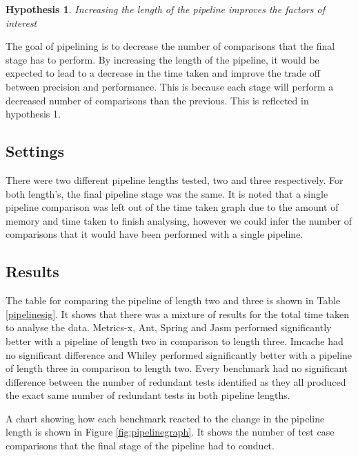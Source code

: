 \documentclass[11pt
              , a4paper
              , twoside
              , openright
              ]{report}
\newtheorem{hyp}{Hypothesis}
\begin{document}
\begin{hyp}
Increasing the length of the pipeline improves the factors of interest
\end{hyp}

The goal of pipelining is to decrease the number of comparisons that the final stage has to perform. By increasing the length of the pipeline, it would be expected to lead to a decrease in the time taken and improve the trade off between precision and performance. This is because each stage will perform a decreased number of comparisons than the previous. This is reflected in hypothesis 1.

\subsection{Settings}
There were two different pipeline lengths tested, two and three respectively. For both length's, the final pipeline stage was the same. It is noted that a single pipeline comparison was left out of the time taken graph due to the amount of memory and time taken to finish analysing, however we could infer the number of comparisons that it would have been performed with a single pipeline.

\subsection{Results}

The table for comparing the pipeline of length two and three is shown in Table \ref{pipelinesig}. It shows that there was a mixture of results for the total time taken to analyse the data. Metrics-x, Ant, Spring and Jasm performed significantly better with a pipeline of length two in comparison to length three. Imcache had no significant difference and Whiley performed significantly better with a pipeline of length three in comparison to length two. Every benchmark had no significant difference between the number of redundant tests identified as they all produced the exact same number of redundant tests in both pipeline lengths.

A chart showing how each benchmark reacted to the change in the pipeline length is shown in Figure \ref{fig:pipelinegraph}. It shows the number of test case comparisons that the final stage of the pipeline had to conduct.
\end{document}
